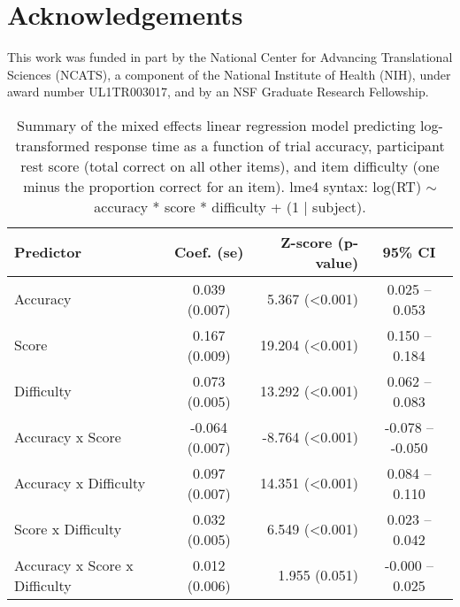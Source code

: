 \documentclass[a4paper,man,natbib]{apa6}
\begin{document}
\section{Acknowledgements}
\noindent This work was funded in part by the National Center for Advancing Translational Sciences (NCATS), a component of the National Institute of Health (NIH), under award number UL1TR003017, and by an NSF Graduate Research Fellowship.



\begin{table}[]
\centering
\begin{tabular*}{\textwidth}{lc@{\hskip 6mm}r@{\hskip 6mm}c}
\toprule
Predictor &  Coef. (se) & Z-score (p-value) & 95\% CI  \\
\midrule
Accuracy & 0.039 (0.007) &   5.367 (<0.001) &  0.025 -- 0.053  \\
Score &  0.167 (0.009) &  19.204 (<0.001) &  0.150 -- 0.184  \\
Difficulty & 0.073 (0.005) &  13.292 (<0.001) &  0.062 -- 0.083  \\
Accuracy x Score & -0.064 (0.007) &  -8.764 (<0.001) & -0.078 -- -0.050  \\
Accuracy x Difficulty & 0.097 (0.007) &  14.351 (<0.001) &  0.084 -- 0.110  \\
Score x Difficulty &  0.032 (0.005) &   6.549 (<0.001) &  0.023 -- 0.042  \\
Accuracy x Score x Difficulty &  0.012 (0.006) & 1.955 (0.051) & -0.000 -- 0.025  \\
\bottomrule
\end{tabular*}
\caption{\label{table:1}\normalfont Summary of the mixed effects linear regression model predicting log-transformed response time as a function of trial accuracy, participant rest score (total correct on all other items), and item difficulty (one minus the proportion correct for an item). \newline lme4 syntax: log(RT) $\sim$ accuracy * score * difficulty + (1 | subject).}
\end{table}
\end{document}
